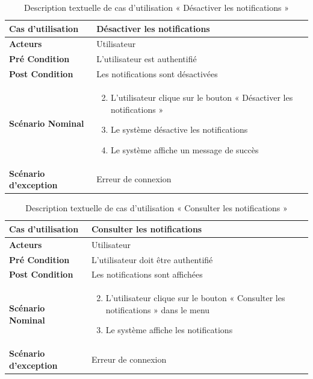 
\begin{longtable}{|p{5cm}|p{10cm}|}
  \caption{Description textuelle de cas d'utilisation « Désactiver les notifications »} \label{tab:use_case_desactiver_notifications} \\
  \hline
  \textbf{Cas d'utilisation}&Désactiver les notifications\\
  \hline
  \textbf{Acteurs}&Utilisateur\\
  \hline
  \textbf{Pré Condition}&L'utilisateur est authentifié\\
  \hline
  \textbf{Post Condition}&Les notifications sont désactivées\\
  \hline
  \textbf{Scénario Nominal}&
  \vspace{-\baselineskip}
  \begin{enumerate}
    \setcounter{enumi}{1}
        \item L'utilisateur clique sur le bouton « Désactiver les notifications »
        \item Le système désactive les notifications
        \item Le système affiche un message de succès
  \end{enumerate}\\
  \hline
  \textbf{Scénario d'exception}&Erreur de connexion\\
  \hline

  \end{longtable}



\begin{longtable}{|p{5cm}|p{10cm}|}
  \caption{Description textuelle de cas d'utilisation « Consulter les notifications »} \label{tab:use_case_consulter_notifications} \\
\hline
\textbf{Cas d'utilisation}&Consulter les notifications\\
\hline
\textbf{Acteurs}&Utilisateur \\
\hline
\textbf{Pré Condition}&L'utilisateur doit être authentifié\\
\hline
\textbf{Post Condition}&Les notifications sont affichées\\
\hline
\textbf{Scénario Nominal}&
\vspace{-\baselineskip}
\begin{enumerate}
    \setcounter{enumi}{1}
        \item L'utilisateur clique sur le bouton « Consulter les notifications » dans le menu
        \item Le système affiche les notifications
\end{enumerate}\\
\hline
\textbf{Scénario d'exception}&Erreur de connexion\\
\hline

\end{longtable}

